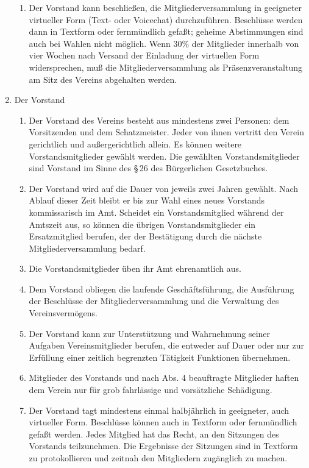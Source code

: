 \documentclass[12pt,a4paper]{article}
\begin{document}
\begin{enumerate}
\begin{enumerate}
\item Der Vorstand kann beschließen, die Mitgliederversammlung in geeigneter virtueller Form (Text- oder Voicechat) durchzuführen. Beschlüsse werden dann in Textform oder fernmündlich gefaßt; geheime Abstimmungen sind auch bei Wahlen nicht möglich. Wenn 30\% der Mitglieder innerhalb von vier Wochen nach Versand der Einladung der virtuellen Form widersprechen, muß die Mitgliederversammlung als Präsenzveranstaltung am Sitz des Vereins abgehalten werden.
\end{enumerate}
\item Der Vorstand
\begin{enumerate}
\item Der Vorstand des Vereins besteht aus mindestens zwei Personen: dem Vorsitzenden und dem Schatzmeister. Jeder von ihnen vertritt den Verein gerichtlich und außergerichtlich allein. Es können weitere Vorstandsmitglieder gewählt werden. Die gewählten Vorstandsmitglieder sind Vorstand im Sinne des §\,26 des Bürgerlichen Gesetzbuches.
\item Der Vorstand wird auf die Dauer von jeweils zwei Jahren gewählt. Nach Ablauf dieser Zeit bleibt er bis zur Wahl eines neues Vorstands kommissarisch im Amt. Scheidet ein Vorstandsmitglied während der Amtszeit aus, so können die übrigen Vorstandsmitglieder ein Ersatzmitglied berufen, der der Bestätigung durch die nächste Mitgliederversammlung bedarf.
\item Die Vorstandsmitglieder üben ihr Amt ehrenamtlich aus.
\item Dem Vorstand obliegen die laufende Geschäftsführung, die Ausführung der Beschlüsse der Mitgliederversammlung und die Verwaltung des Vereinsvermögens.
\item Der Vorstand kann zur Unterstützung und Wahrnehmung seiner Aufgaben Vereinsmitglieder berufen, die entweder auf Dauer oder nur zur Erfüllung einer zeitlich begrenzten Tätigkeit Funktionen übernehmen.
\item Mitglieder des Vorstands und nach Abs. 4 beauftragte Mitglieder haften dem Verein nur für grob fahrlässige und vorsätzliche Schädigung. 
\item Der Vorstand tagt mindestens einmal halbjährlich in geeigneter, auch virtueller Form. Beschlüsse können auch in Textform oder fernmündlich gefaßt werden. Jedes Mitglied hat das Recht, an den Sitzungen des Vorstands teilzunehmen. Die Ergebnisse der Sitzungen sind in Textform zu protokollieren und zeitnah den Mitgliedern zugänglich zu machen.
\end{enumerate}
\end{enumerate}
\end{document}
